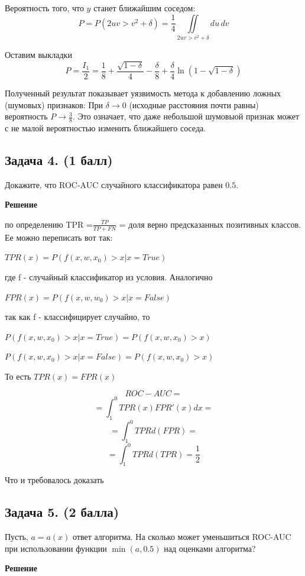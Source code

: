 \documentclass{article}
\begin{document}
Вероятность того, что $y$ станет ближайшим соседом:
$$
P = P(2uv > v^2 + \delta) = \frac{1}{4} \iint\limits_{2uv > v^2 + \delta} du\,dv
$$

Оставим выкладки 
$$
P = \frac{I_1}{2} = \frac{1}{8} + \frac{\sqrt{1 - \delta}}{4} - \frac{\delta}{8} + \frac{\delta}{4} \ln(1 - \sqrt{1 - \delta})
$$

Полученный результат показывает уязвимость метода к добавлению ложных (шумовых) признаков:
При $\delta \to 0$ (исходные расстояния почти равны) вероятность $P \to \frac{3}{8}$. Это означает, что даже небольшой шумовыой признак может с не малой вероятностью изменить ближайшего соседа.

\subsection*{Задача 4. (1 балл)}

    Докажите, что ROC-AUC случайного классификатора равен $0.5$.

\noindent
\textbf{Решение}

по определению TPR =$ \frac{TP}{TP + FN}$ = доля верно предсказанных позитивных классов. Ее можно переписать вот так:

\noindent
$TPR(x) = P(f(x, w, x_0) > x | x = True)$

где f - случайный классификатор из условия. Аналогично

\noindent
$FPR(x) = P(f(x, w, w_0) > x | x = False)$

так как f - классифицирует случайно, то 

\noindent
$P(f(x, w, x_0) > x | x = True) = P(f(x, w, x_0) > x)$

\noindent
$P(f(x, w, x_0) > x | x = False) = P(f(x, w, x_0) > x)$

То есть $TPR(x) = FPR(x)$

$$ROC-AUC =$$
$$= \int_1^0 TPR(x) FPR'(x)dx =$$
$$= \int_1^0 TPR d(FPR) = $$
$$= \int_1^0 TPR d(TPR) = \frac{1}{2}$$

Что и требовалось доказать

\subsection*{Задача 5. (2 балла)}

    Пусть, $a = a(x)$ ответ алгоритма. На сколько может уменьшиться ROC-AUC при использовании функции $\min(a, 0.5)$ над оценками алгоритма?

\noindent
\textbf{Решение}
\end{document}
